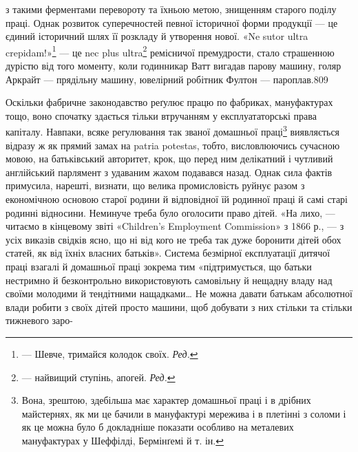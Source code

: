 \parcont{}  %
з такими ферментами перевороту та їхньою метою, знищенням
старого поділу праці. Однак розвиток суперечностей певної історичної
форми продукції — це єдиний історичний шлях її розкладу
й утворення нової. «Ne sutor ultra crepidam!»\footnote*{
— Шевче, тримайся колодок своїх. \emph{Ред.}
} — це nec plus
ultra\footnote*{
— найвищий ступінь, апогей. \emph{Ред.}
} ремісничої премудрости, стало страшенною дурістю від
того моменту, коли годинникар Ватт вигадав парову машину,
голяр Аркрайт — прядільну машину, ювелірний робітник Фултон
— пароплав.809

Оскільки фабричне законодавство реґулює працю по фабриках,
мануфактурах тощо, воно спочатку здається тільки втручанням
у експлуататорські права капіталу. Навпаки, всяке регулювання
так званої домашньої праці\footnote{
Вона, зрештою, здебільша має характер домашньої праці і в
дрібних майстернях, як ми це бачили в мануфактурі мережива і в плетінні
з соломи і як це можна було б докладніше показати особливо на металевих
мануфактурах у Шеффілді, Бермінґемі й т. ін.
} виявляється відразу ж
як прямий замах на patria potestas, тобто, висловлюючись сучасною
мовою, на батьківський авторитет, крок, що перед ним делікатний
і чутливий англійський парлямент з удаваним жахом
подавався назад. Однак сила фактів примусила, нарешті, визнати,
що велика промисловість руйнує разом з економічною основою
старої родини й відповідної їй родинної праці й самі старі родинні
відносини. Неминуче треба було оголосити право дітей. «На лихо,
— читаємо в кінцевому звіті «Children’s Employment Commission»
з 1866 р., — з усіх виказів свідків ясно, що ні від кого
не треба так дуже боронити дітей обох статей, як від їхніх власних
батьків». Система безмірної експлуатації дитячої праці взагалі
й домашньої праці зокрема тим «підтримується, що батьки нестримно
й безконтрольно використовують самовільну й нещадну
владу над своїми молодими й тендітними нащадками\dots{} Не можна
давати батькам абсолютної влади робити з своїх дітей просто
машини, щоб добувати з них стільки та стільки тижневого заро-

